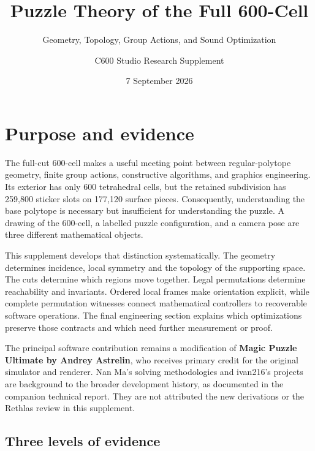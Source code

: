 \documentclass[
  10pt,
  a4paper,
]{article}
\title{Puzzle Theory of the Full 600-Cell}
\subtitle{Geometry, Topology, Group Actions, and Sound Optimization}
\author{C600 Studio Research Supplement}
\date{7 September 2026}
\begin{document}
\maketitle

{
\setcounter{tocdepth}{2}
\tableofcontents
}\clearpage
\section{Purpose and evidence}\label{purpose-and-evidence}

The full-cut 600-cell makes a useful meeting point between
regular-polytope geometry, finite group actions, constructive
algorithms, and graphics engineering. Its exterior has only 600
tetrahedral cells, but the retained subdivision has 259,800 sticker
slots on 177,120 surface pieces. Consequently, understanding the base
polytope is necessary but insufficient for understanding the puzzle. A
drawing of the 600-cell, a labelled puzzle configuration, and a camera
pose are three different mathematical objects.

This supplement develops that distinction systematically. The geometry
determines incidence, local symmetry and the topology of the supporting
space. The cuts determine which regions move together. Legal
permutations determine reachability and invariants. Ordered local frames
make orientation explicit, while complete permutation witnesses connect
mathematical controllers to recoverable software operations. The final
engineering section explains which optimizations preserve those
contracts and which need further measurement or proof.

The principal software contribution remains a modification of
\textbf{Magic Puzzle Ultimate by Andrey Astrelin}, who receives primary
credit for the original simulator and renderer. Nan Ma's solving
methodologies and ivan216's projects are background to the broader
development history, as documented in the companion technical report.
They are not attributed the new derivations or the Rethlas review in
this supplement.

\subsection{Three levels of evidence}\label{three-levels-of-evidence}
\end{document}

